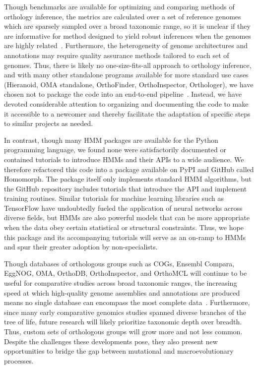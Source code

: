 Though benchmarks are available for optimizing and comparing methods of orthology inference, the metrics are calculated over a set of reference genomes which are sparsely sampled over a broad taxonomic range, so it is unclear if they are informative for method designed to yield robust inferences when the genomes are highly related~\cite{Nevers2022}. Furthermore, the heterogeneity of genome architectures and annotations may require quality assurance methods tailored to each set of genomes. Thus, there is likely no one-size-fits-all approach to orthology inference, and with many other standalone programs available for more standard use cases (Hieranoid, OMA standalone, OrthoFinder, OrthoInspector, Orthologer), we have chosen not to package the code into an end-to-end pipeline~\cite{Kaduk2017, Altenhoff2019, Emms2019, Linard2014, Zdobnov2020}. Instead, we have devoted considerable attention to organizing and documenting the code to make it accessible to a newcomer and thereby facilitate the adaptation of specific steps to similar projects as needed.

In contrast, though many HMM packages are available for the Python programming language, we found none were satisfactorily documented or contained tutorials to introduce HMMs and their APIs to a wide audience. We therefore refactored this code into a package available on PyPI and GitHub called Homomorph. The package itself only implements standard HMM algorithms, but the GitHub repository includes tutorials that introduce the API and implement training routines. Similar tutorials for machine learning libraries such as TensorFlow have undoubtedly fueled the application of neural networks across diverse fields, but HMMs are also powerful models that can be more appropriate when the data obey certain statistical or structural constraints. Thus, we hope this package and its accompanying tutorials will serve as an on-ramp to HMMs and spur their greater adoption by non-specialists.

Though databases of orthologous groups such as COGs, Ensembl Compara, EggNOG, OMA, OrthoDB, OrthoInspector, and OrthoMCL will continue to be useful for comparative studies across broad taxonomic ranges, the increasing speed at which high-quality genome assemblies and annotations are produced means no single database can encompass the most complete data~\cite{Galperin2020, Herrero2016, HuertaCepas2018, Altenhoff2020, Zdobnov2020, Nevers2018, Chen2006}. Furthermore, since many early comparative genomics studies spanned diverse branches of the tree of life, future research will likely prioritize taxonomic depth over breadth. Thus, custom sets of orthologous groups will grow more and not less common. Despite the challenges these developments pose, they also present new opportunities to bridge the gap between mutational and macroevolutionary processes.

